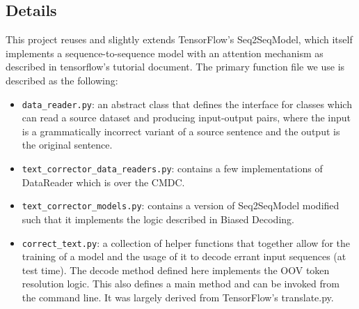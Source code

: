 \subsection{Details}
This project reuses and slightly extends TensorFlow's Seq2SeqModel, which itself implements a sequence-to-sequence model with an attention mechanism as described in tensorflow’s tutorial document. The primary function file we use is described as the following:
\begin{itemize}
    \item \texttt{data\_reader.py}: an abstract class that defines the interface for classes which can read a source dataset and producing input-output pairs, where the input is a grammatically incorrect variant of a source sentence and the output is the original sentence.
    \item \texttt{text\_corrector\_data\_readers.py}: contains a few implementations of DataReader which is over the CMDC.
    \item \texttt{text\_corrector\_models.py}: contains a version of Seq2SeqModel modified such that it implements the logic described in Biased Decoding.
    \item \texttt{correct\_text.py}: a collection of helper functions that together allow for the training of a model and the usage of it to decode errant input sequences (at test time). The decode method defined here implements the OOV token resolution logic. This also defines a main method and can be invoked from the command line. It was largely derived from TensorFlow's translate.py.
\end{itemize}

